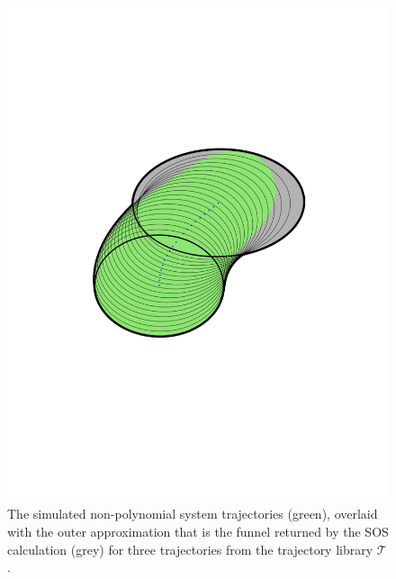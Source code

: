 \begin{figure}[!t]
\begin{minipage}[l]{0.3\columnwidth}
    \includegraphics[width=1\columnwidth, trim={0cm 6cm 0cm
      6cm}]{figures/method/FunnelSimnew5}
  \end{minipage}
  \caption[A visualization of the simulated and the calculated reachable set]{The simulated non-polynomial system trajectories (green), overlaid
    with the outer approximation that is the funnel returned by the \ac{SOS}
    calculation (grey) for three trajectories from the trajectory library
    \(\mathcal{T}\).}
  \label{fig:funnel-simulated-overlaid}
\end{figure}
